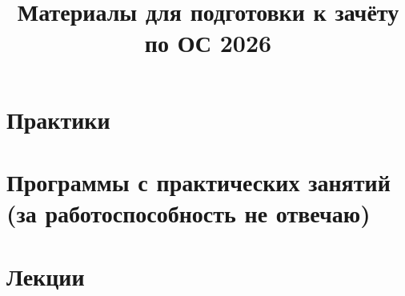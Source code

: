 \documentclass[12pt]{article}
\begin{document}
\author{}
\title{Материалы для подготовки к зачёту по ОС 2026}
\date{}
\maketitle
\tableofcontents

\newpage
\section{Практики}


\newpage
\section{Программы с практических занятий (за работоспособность не отвечаю)}


\newpage
\section{Лекции}

\end{document}
